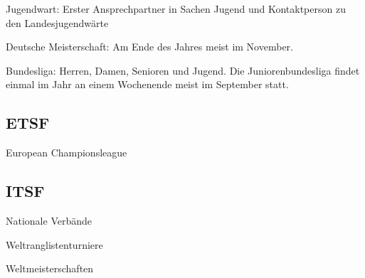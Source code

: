 Jugendwart: Erster Ansprechpartner in Sachen Jugend 
und Kontaktperson zu den Landesjugendwärte

Deutsche Meisterschaft: Am Ende des Jahres meist im November.

Bundesliga: Herren, Damen, Senioren und Jugend. Die Juniorenbundesliga findet einmal im Jahr an einem Wochenende meist im September statt. 

\subsection{ETSF}

European Championsleague

\subsection{ITSF}

Nationale Verbände

Weltranglistenturniere

Weltmeisterschaften


